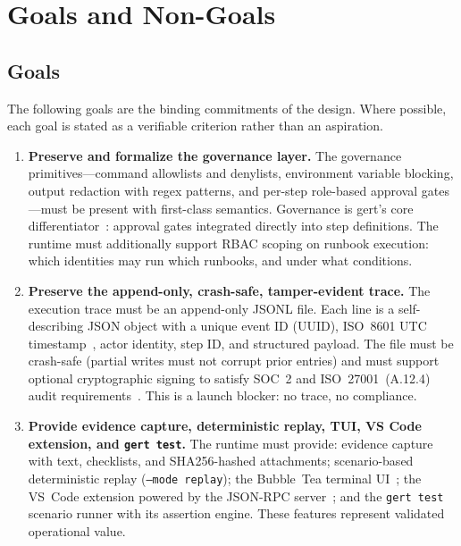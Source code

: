 \chapter{Goals and Non-Goals}
\label{ch:goals}

\section{Goals}

The following goals are the binding commitments of the design. Where possible, each goal is stated
as a verifiable criterion rather than an aspiration.

\begin{enumerate}[label=\textbf{G\arabic*.}]

  \item \textbf{Preserve and formalize the governance layer.}
    The governance primitives---command allowlists and denylists, environment
    variable blocking, output redaction with regex patterns, and per-step role-based approval
    gates---must be present with first-class semantics. Governance is gert's core
    differentiator~\cite{pagerduty-automation,aws-ssm-runbooks}: approval gates
    integrated directly into step definitions. The runtime must additionally support RBAC scoping on runbook
    execution: which identities may run which runbooks, and under what conditions.

  \item \textbf{Preserve the append-only, crash-safe, tamper-evident trace.}
    The execution trace must be an append-only JSONL file. Each line is a self-describing JSON
    object with a unique event ID (UUID), ISO~8601 UTC timestamp~\cite{rfc3339}, actor identity, step ID, and
    structured payload. The file must be crash-safe (partial writes must not corrupt prior entries)
    and must support optional cryptographic signing to satisfy SOC~2 and ISO~27001~(A.12.4) audit
    requirements~\cite{soc2-aicpa,iso27001}. This is a launch blocker: no trace, no compliance.

  \item \textbf{Provide evidence capture, deterministic replay, TUI, VS Code extension, and
    \texttt{gert test}.}
    The runtime must provide: evidence capture with text,
    checklists, and SHA256-hashed attachments; scenario-based deterministic replay (\texttt{--mode
    replay}); the Bubble~Tea terminal UI~\cite{bubbletea-framework}; the VS~Code extension powered by the JSON-RPC server~\cite{jsonrpc-spec,vscode-extension-api}; and
    the \texttt{gert test} scenario runner with its assertion engine. These features represent
    validated operational value.


\end{enumerate}
